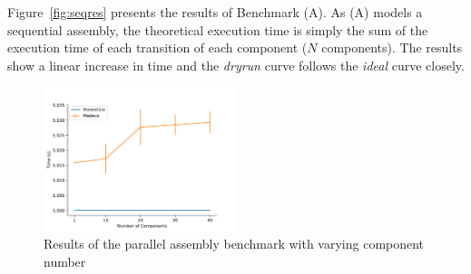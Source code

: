 Figure~\ref{fig:seqres} presents the results of Benchmark (A). As (A)
models a sequential assembly, the theoretical execution time is simply
the sum of the execution time of each transition of each component
($N$ components). The results show a linear increase in time and the
\emph{dryrun} curve follows the \emph{ideal} curve closely.

\begin{figure}[h]
  \begin{center} 
    \includegraphics[width=0.5\textwidth]{./images/evaluations_par_component.pdf}
    \caption{Results of the parallel assembly benchmark with varying component number}
    \label{fig:parcompres}
  \end{center}
\end{figure}


